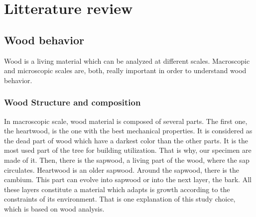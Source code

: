 
\chapter{Litterature review}
\label{Chapter1}
\section{Wood behavior}


Wood is a living material which can be analyzed at different scales. Macroscopic and microscopic scales are, both, really important in order to understand wood behavior.

\subsection{Wood Structure and composition}

In macroscopic scale, wood material is composed of several parts. The first one, the heartwood, is the one with the best mechanical properties. It is considered as the dead part of wood which have a darkest color than the other parts. It is the most used part of the tree for building utilization. That is why, our specimen are made of it. Then, there is the sapwood, a living part of the wood, where the sap circulates. Heartwood is an older sapwood. Around the sapwood, there is the cambium. This part can evolve into sapwood or into the next layer, the bark. All these layers constitute a material which adapts is growth according to the constraints of its environment. That is one explanation of this study choice, which is based on wood analysis.

